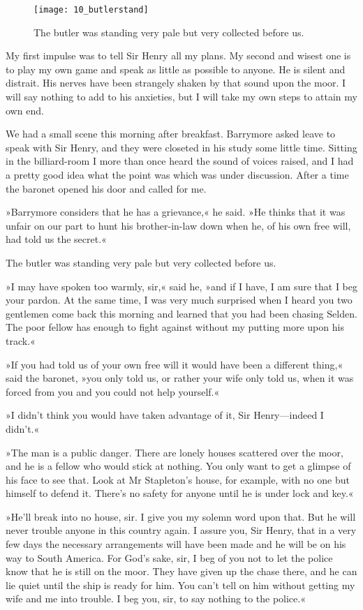 \begin{wrapfigure}[18]{O}{0.6\textwidth}
\centering
\texttt{[image: 10\_butlerstand]}
\caption{The butler was standing very pale but very collected before us.}
\end{wrapfigure}

My first impulse was to tell Sir Henry all my plans. My second and wisest one is to play my own game and speak as little as possible to anyone. He is silent and distrait. His nerves have been strangely shaken by that sound upon the moor. I will say nothing to add to his anxieties, but I will take my own steps to attain my own end.

We had a small scene this morning after breakfast. Barrymore asked leave to speak with Sir Henry, and they were closeted in his study some little time. Sitting in the billiard-room I more than once heard the sound of voices raised, and I had a pretty good idea what the point was which was under discussion. After a time the baronet opened his door and called for me.

»Barrymore considers that he has a grievance,« he said. »He thinks that it was unfair on our part to hunt his brother-in-law down when he, of his own free will, had told us the secret.«

The butler was standing very pale but very collected before us.

»I may have spoken too warmly, sir,« said he, »and if I have, I am sure that I beg your pardon. At the same time, I was very much surprised when I heard you two gentlemen come back this morning and learned that you had been chasing Selden. The poor fellow has enough to fight against without my putting more upon his track.«

»If you had told us of your own free will it would have been a different thing,« said the baronet, »you only told us, or rather your wife only told us, when it was forced from you and you could not help yourself.«

»I didn't think you would have taken advantage of it, Sir Henry\allowbreak---\allowbreak indeed I didn't.«

»The man is a public danger. There are lonely houses scattered over the moor, and he is a fellow who would stick at nothing. You only want to get a glimpse of his face to see that. Look at Mr Stapleton's house, for example, with no one but himself to defend it. There's no safety for anyone until he is under lock and key.«

»He'll break into no house, sir. I give you my solemn word upon that. But he will never trouble anyone in this country again. I assure you, Sir Henry, that in a very few days the necessary arrangements will have been made and he will be on his way to South America. For God's sake, sir, I beg of you not to let the police know that he is still on the moor. They have given up the chase there, and he can lie quiet until the ship is ready for him. You can't tell on him without getting my wife and me into trouble. I beg you, sir, to say nothing to the police.«

